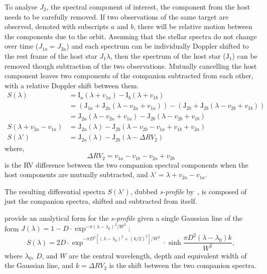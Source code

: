 To analyse \(J_2\), the spectral component of interest, the component from the host needs to be carefully removed.
If two observations of the same target are observed, denoted with subscripts \(a\) and \(b\), there will be relative motion between the components due to the orbit.
Assuming that the stellar spectra do not change over time (\(J_{1a} = J_{2a}\)) and each spectrum can be individually Doppler shifted to the rest frame of the host star \(J_1{\lambda}\), then the spectrum of the host star (\(\textrm{J}_{1}\)) can be removed though subtraction of the two observations.
Mutually cancelling the host component leaves two components of the companion subtracted from each other, with a relative Doppler shift between them.
\begin{align}
S(\lambda) &= \textrm{I}_{a}(\lambda + v_{1a}) - \textrm{I}_{b}(\lambda + v_{1b}) \nonumber \\
&= (\textrm{J}_{1a} + \textrm{J}_{2a}(\lambda - v_{2a} + v_{1a})) - (\textrm{J}_{2b} +\textrm{J}_{2b}(\lambda - v_{2b} + v_{1b})) \nonumber \\
&= \textrm{J}_{2a}(\lambda - v_{2a} + v_{1a}) - \textrm{J}_{2b}(\lambda - v_{2b} + v_{1b}) \nonumber \\
S(\lambda + v_{2a}-v_{1a}) &= \textrm{J}_{2a}(\lambda) - \textrm{J}_{2b}(\lambda - v_{2b} - v_{1a} + v_{1b} + v_{2a})\\
S(\lambda') &= \textrm{J}_{2a}(\lambda) - \textrm{J}_{2b}(\lambda - \Delta {RV}_2) \label{eqn:sprofile}
\end{align}
where,
\begin{equation}
\Delta {RV}_2 = v_{1a} - v_{1b} - v_{2a} + v_{2b} \label{eqn:companion_difference}
\end{equation}
is the {RV} difference between the two companion spectral components when the host components are mutually subtracted,
and \(\lambda' = \lambda + v_{2a}-v_{1a}\).

The resulting differential spectra \(S({\lambda'})\), dubbed \emph{s-profile} by~\citet{ferluga_separating_1997}, is composed of just the companion spectra, shifted and subtracted from itself.

\citet{ferluga_separating_1997} provide an analytical form for the \emph{s-profile} given a single Gaussian line of the form
$J(\lambda) = 1- D \cdot\exp^{{-\pi {(\lambda - \lambda_0)}^2} / {{W}^{2}}}$:
\begin{equation}
    S(\lambda) = 2 D\cdot\exp^{{-\pi {D}^{2} [{(\lambda - \lambda_0)}^{2} +{(k/2)}^{2}]}/{{W}^{2}}} \cdot \sinh{\frac{\pi {D}^{2}(\lambda-\lambda_0)k}{{W}^{2}}},\label{eqn:sprofile_gaussain}
\end{equation}
where $\lambda_0$, $D$, and $W$ are the central wavelength, depth and equivalent width of the Gaussian line, and $k=\Delta {RV}_2 $ is the shift between the two companion spectra.


